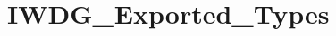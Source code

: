 \hypertarget{group__IWDG__Exported__Types}{
\section{IWDG\_\-Exported\_\-Types}
\label{group__IWDG__Exported__Types}
}
